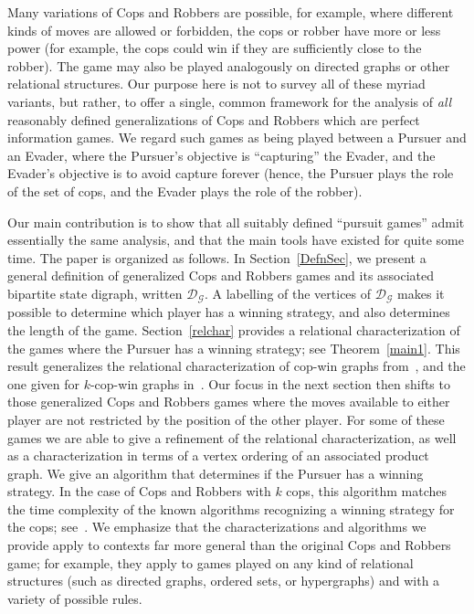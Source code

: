 \documentclass[12pt,reqno]{amsart}
\begin{document}
Many variations of Cops and Robbers are possible, for example, where different kinds of moves are allowed or forbidden, the cops or robber have more or less power (for example, the cops could win if
they are sufficiently close to the robber). The game may also be played analogously on directed graphs or other relational structures. Our purpose here is not to survey all of these myriad variants,
but rather, to offer a single, common framework for the analysis of \emph{all} reasonably defined generalizations of Cops and Robbers which are perfect information games. We regard such games as
being played between a Pursuer and an Evader, where the Pursuer's objective is ``capturing'' the Evader, and the Evader's objective is to avoid capture forever (hence, the Pursuer plays the role of
the set of cops, and the Evader plays the role of the robber).

Our main contribution is to show that all suitably defined ``pursuit games'' admit essentially the same analysis, and
that the main tools have existed for quite some time.
The paper is organized as follows. In Section~\ref{DefnSec}, we present a general definition of generalized Cops and Robbers games and its associated bipartite state digraph, written
$\mathcal{D}_\mathcal{G}$. A labelling of the vertices of $\mathcal{D}_\mathcal{G}$ makes it possible to determine which player has a winning strategy, and also determines the length of the game.
Section~\ref{relchar} provides a relational characterization of the games where the Pursuer has a winning strategy; see Theorem~\ref{main1}.  This result generalizes the relational characterization
of cop-win graphs from~\cite{NW}, and the one given for $k$-cop-win graphs in~\cite{cm,HM}.  Our focus in the next section then shifts to those generalized Cops and Robbers games where the moves
available to either player are not restricted by the position of the other player.  For some of these games we are able to give a refinement of the relational characterization, as well as a
characterization in terms of a vertex ordering of an associated product graph.  We give an algorithm that determines if the Pursuer has a winning strategy.  In the case of Cops and Robbers with $k$
cops, this algorithm matches the time complexity of the known algorithms recognizing a winning strategy for the cops; see~\cite{bcp,bonatorjn,cm}. We emphasize that the characterizations and
algorithms we provide apply to contexts far more general than the original Cops and Robbers game; for example, they apply to games played on any kind of relational structures (such as directed
graphs, ordered sets, or hypergraphs) and with a variety of possible rules.
\end{document}
